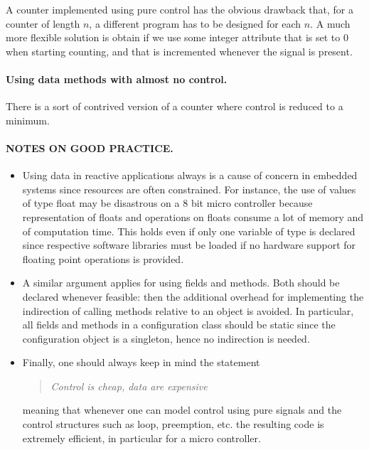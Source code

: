 A counter implemented using pure control has the obvious drawback 
that, 
for a counter of length $n$, a different program has to be designed 
for each $n$. A much more flexible solution is obtain if we use some 
integer attribute that is set to $0$ when starting counting, and that 
is incremented whenever the signal  is present.
% 
% 
\paragraph{Using data methods with almost no control.} There is a 
sort of contrived version of a counter where control is reduced to a 
minimum.
% 
%

\paragraph{NOTES ON GOOD PRACTICE.}
\begin{itemize}
\item  Using data in reactive applications always
 is a cause of concern in embedded systems since resources are often
 constrained. For instance, the use of values of type float may be
 disastrous on a 8 bit micro controller because representation of floats
 and operations on floats consume a lot of memory and of computation time.
 This holds even if only one variable of type  is declared
 since respective software libraries must be loaded if no hardware support
 for floating point operations is provided.
 
 \item A similar argument applies for using fields and methods. Both should be
 declared  whenever feasible: then the additional overhead
 for implementing the indirection of calling methods relative to an
 object is avoided. In particular, all fields and methods in a 
 configuration class should be static since the configuration object is
 a singleton, hence no indirection is needed. 
 
 \item Finally, one should always keep in mind the statement
  \begin{quotation}
     \emph{Control is cheap, data are expensive}
  \end{quotation}
  meaning that whenever one can model control using pure signals and 
  the control structures such as loop, preemption, etc. the resulting
  code is extremely efficient, in particular for a micro controller.

\end{itemize}

